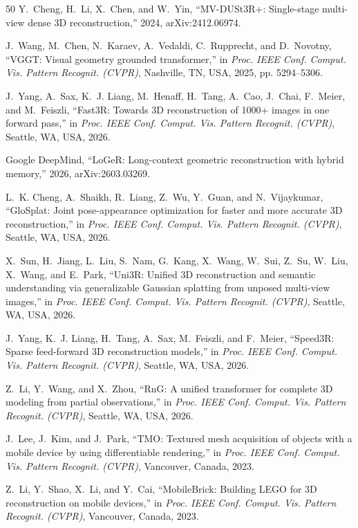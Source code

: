 \documentclass[journal]{IEEEtran}
\begin{document}
\begin{thebibliography}{50}
 Y.~Cheng, H.~Li, X.~Chen, and W.~Yin, ``MV-DUSt3R+: Single-stage multi-view dense 3D reconstruction,'' 2024, arXiv:2412.06974.

 J.~Wang, M.~Chen, N.~Karaev, A.~Vedaldi, C.~Rupprecht, and D.~Novotny, ``VGGT: Visual geometry grounded transformer,'' in \textit{Proc. IEEE Conf. Comput. Vis. Pattern Recognit. (CVPR)}, Nashville, TN, USA, 2025, pp. 5294--5306.

 J.~Yang, A.~Sax, K.~J. Liang, M.~Henaff, H.~Tang, A.~Cao, J.~Chai, F.~Meier, and M.~Feiszli, ``Fast3R: Towards 3D reconstruction of 1000+ images in one forward pass,'' in \textit{Proc. IEEE Conf. Comput. Vis. Pattern Recognit. (CVPR)}, Seattle, WA, USA, 2026.

 Google DeepMind, ``LoGeR: Long-context geometric reconstruction with hybrid memory,'' 2026, arXiv:2603.03269.

 L.~K. Cheng, A.~Shaikh, R.~Liang, Z.~Wu, Y.~Guan, and N.~Vijaykumar, ``GloSplat: Joint pose-appearance optimization for faster and more accurate 3D reconstruction,'' in \textit{Proc. IEEE Conf. Comput. Vis. Pattern Recognit. (CVPR)}, Seattle, WA, USA, 2026.

 X.~Sun, H.~Jiang, L.~Liu, S.~Nam, G.~Kang, X.~Wang, W.~Sui, Z.~Su, W.~Liu, X.~Wang, and E.~Park, ``Uni3R: Unified 3D reconstruction and semantic understanding via generalizable Gaussian splatting from unposed multi-view images,'' in \textit{Proc. IEEE Conf. Comput. Vis. Pattern Recognit. (CVPR)}, Seattle, WA, USA, 2026.

 J.~Yang, K.~J. Liang, H.~Tang, A.~Sax, M.~Feiszli, and F.~Meier, ``Speed3R: Sparse feed-forward 3D reconstruction models,'' in \textit{Proc. IEEE Conf. Comput. Vis. Pattern Recognit. (CVPR)}, Seattle, WA, USA, 2026.

 Z.~Li, Y.~Wang, and X.~Zhou, ``RnG: A unified transformer for complete 3D modeling from partial observations,'' in \textit{Proc. IEEE Conf. Comput. Vis. Pattern Recognit. (CVPR)}, Seattle, WA, USA, 2026.

 J.~Lee, J.~Kim, and J.~Park, ``TMO: Textured mesh acquisition of objects with a mobile device by using differentiable rendering,'' in \textit{Proc. IEEE Conf. Comput. Vis. Pattern Recognit. (CVPR)}, Vancouver, Canada, 2023.

 Z.~Li, Y.~Shao, X.~Li, and Y.~Cai, ``MobileBrick: Building LEGO for 3D reconstruction on mobile devices,'' in \textit{Proc. IEEE Conf. Comput. Vis. Pattern Recognit. (CVPR)}, Vancouver, Canada, 2023.


\end{thebibliography}
\end{document}
